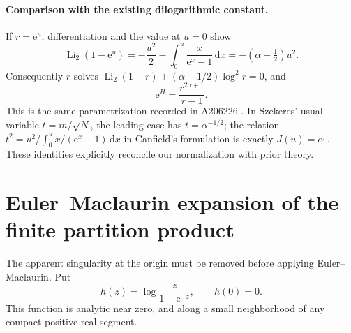 \documentclass[11pt,a4paper]{article}
\numberwithin{equation}{section}
\theoremstyle{definition}
\theoremstyle{remark}
\DeclareMathOperator{\Li}{Li}
\newcommand{\dd}{\,\mathrm d}
\newcommand{\e}{\mathrm e}
\begin{document}
\paragraph{Comparison with the existing dilogarithmic constant.}
If $r=\e^u$, differentiation and the value at $u=0$ show
\begin{equation}
 \Li_2(1-\e^u)
 =-\frac{u^2}{2}-\int_0^u\frac{x}{\e^x-1}\dd x
 =-(\alpha+\tfrac12)u^2.
 \label{srp:eq:dilog-match}
\end{equation}
Consequently $r$ solves
$\Li_2(1-r)+(\alpha+1/2)\log^2r=0$, and
\begin{equation}
 \e^H=\frac{r^{2\alpha+1}}{r-1}.
 \label{srp:eq:d-match}
\end{equation}
This is the same parametrization recorded in A206226
\cite{oeisSquare}. In Szekeres' usual variable $t=m/\sqrt N$, the leading
case has $t=\alpha^{-1/2}$; the relation
$t^2=u^2/\int_0^u x/(\e^x-1)\dd x$ in Canfield's formulation is exactly
$J(u)=\alpha$ \cite{canfield}. These identities explicitly reconcile our
normalization with prior theory.

\section{Euler--Maclaurin expansion of the finite partition product}
\label{srp:sec:EM}

The apparent singularity at the origin must be removed before applying
Euler--Maclaurin. Put
\begin{equation}
 h(z)=\log\frac{z}{1-\e^{-z}},\qquad h(0)=0.
 \label{srp:eq:h}
\end{equation}
This function is analytic near zero, and along a small neighborhood of any
compact positive-real segment.
\end{document}
